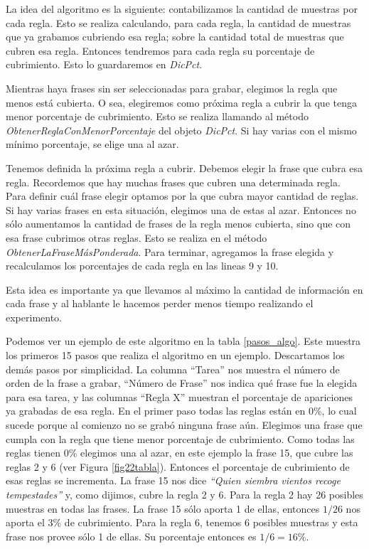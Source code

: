 La idea del algoritmo es la siguiente:  contabilizamos la cantidad de muestras por cada regla. Esto se realiza calculando, para cada regla, la cantidad de muestras que ya grabamos cubriendo esa regla; sobre la cantidad total de muestras que cubren esa regla. Entonces tendremos para cada regla su porcentaje de cubrimiento. Esto lo guardaremos en \textit{DicPct}.

Mientras haya frases sin ser seleccionadas para grabar, elegimos la regla que menos está cubierta. O sea, elegiremos como próxima regla a cubrir la que tenga menor porcentaje de cubrimiento. Esto se realiza llamando al método \textit{ObtenerReglaConMenorPorcentaje} del objeto \textit{DicPct}. Si hay varias con el mismo mínimo porcentaje, se elige una al azar.

Tenemos definida la próxima regla a cubrir. Debemos elegir la frase que cubra esa regla. Recordemos que hay muchas frases que cubren una determinada regla. Para definir cuál frase elegir optamos por la que cubra mayor cantidad de reglas. Si hay varias frases en esta situación, elegimos una de estas al azar. Entonces no sólo aumentamos la cantidad de frases de la regla menos cubierta, sino que con esa frase cubrimos otras reglas. Esto se realiza en el método \textit{ObtenerLaFraseMásPonderada}. Para terminar, agregamos la frase elegida y recalculamos los porcentajes de cada regla en las lineas 9 y 10.

Esta idea es importante ya que llevamos al máximo la cantidad de información en cada frase y al hablante le hacemos perder menos tiempo realizando el experimento.

Podemos ver un ejemplo de este algoritmo en la tabla \ref{pasos_algo}. Este muestra los primeros 15 pasos que realiza el algoritmo en un ejemplo. Descartamos los demás pasos por simplicidad. La columna ``Tarea'' nos muestra el número de orden de la frase a grabar, ``Número de Frase'' nos indica qué frase fue la elegida para esa tarea, y las columnas ``Regla X'' muestran el porcentaje de apariciones ya grabadas de esa regla. En el primer paso todas las reglas están en 0\%, lo cual sucede porque al comienzo no se grabó ninguna frase aún.  Elegimos una frase que cumpla con la regla que tiene menor porcentaje de cubrimiento. Como todas las reglas tienen 0\% elegimos una al azar, en este ejemplo la frase 15, que cubre las reglas 2 y 6 (ver Figura \ref{fig22tabla}). Entonces el porcentaje de cubrimiento de esas reglas se incrementa. 
La frase 15 nos dice \textit{``Quien siembra vientos recoge tempestades''} y, como dijimos, cubre la regla 2 y 6. Para la regla 2 hay 26 posibles muestras en todas las frases. La frase 15 sólo aporta 1 de ellas, entonces $1/26$ nos aporta el 3\% de cubrimiento. Para la regla 6, tenemos 6 posibles muestras y esta frase nos provee sólo 1 de ellas. Su porcentaje entonces es $1/6 = 16\%$. 

